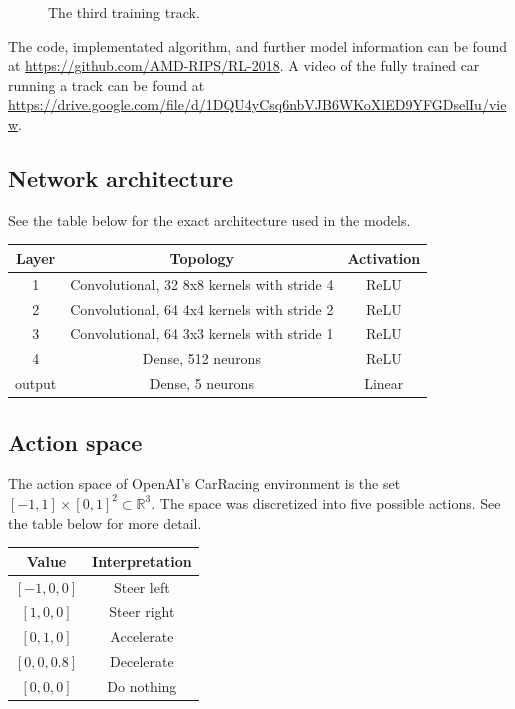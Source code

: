 \documentclass{article}
\begin{document}
\begin{figure}[!h]
\begin{minipage}[t]{.3\textwidth}
  \caption{The third training track.}
  \label{fig:curves_comparison}
\end{minipage}
\vspace{-2.5mm}
\end{figure}

The code, implementated algorithm, and further model information can
be found at \url{https://github.com/AMD-RIPS/RL-2018}. A video of the
fully trained car running a track can be found at
\url{https://drive.google.com/file/d/1DQU4yCsq6nbVJB6WKoXlED9YFGDselIu/view}. 

\subsection{Network architecture}
See the table below for the exact architecture used in the models. 
\begin{table}[h!]
  \begin{center}
    \begin{tabular}{c|c|c}
      \textbf{Layer} & \textbf{Topology} & \textbf{Activation}\\
      \hline
      1 & Convolutional, 32 8x8 kernels with stride 4 & ReLU \\
      2 & Convolutional, 64 4x4 kernels with stride 2 & ReLU \\      
      3 & Convolutional, 64 3x3 kernels with stride 1 & ReLU \\
      4 & Dense, 512 neurons & ReLU \\
      output & Dense, 5 neurons & Linear \\
    \end{tabular}
    \vspace{0.1cm}
    \label{tab:network_architecture}
  \end{center}
\end{table}

\subsection{Action space}
The action space of OpenAI's CarRacing environment is the set $[-1,1]
\times [0,1]^2 \subset \mathbb{R}^3$. The space was discretized into
five possible actions. See the table below for more detail.  
\begin{table}[h!]
  \begin{center}
    \begin{tabular}{c|c}
      \textbf{Value} & \textbf{Interpretation} \\
      \hline
      $[-1,0,0]$ & Steer left \\
      $[1,0,0]$ & Steer right \\
      $[0,1,0]$ & Accelerate \\
      $[0,0,0.8]$ & Decelerate \\
      $[0,0,0]$ & Do nothing \\
    \end{tabular}
    \vspace{0.1cm}
    \label{tab:actions}
  \end{center}
\end{table}
\end{document}
